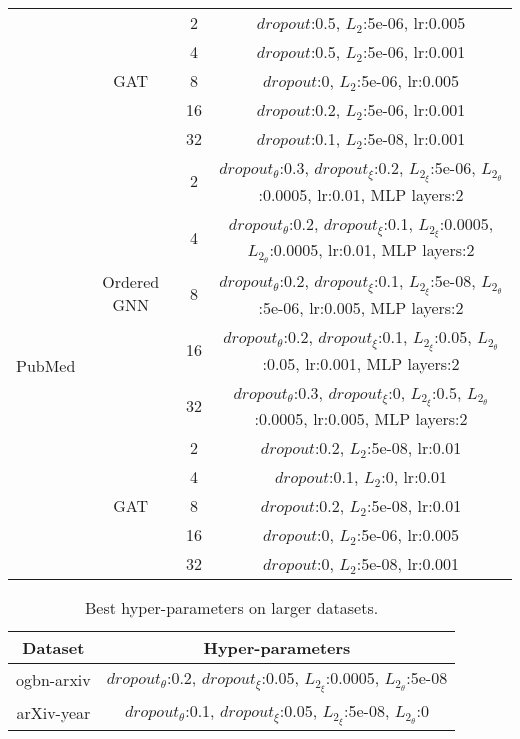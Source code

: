 \documentclass{article}
\begin{document}
\begin{table}
{\begin{tabular}{cc|c|c}
& \multirow{5}{*}{GAT} & 2 & $dropout$:0.5, $L_{2}$:5e-06, lr:0.005\\
\cline{3-4}
&& 4 & $dropout$:0.5, $L_{2}$:5e-06, lr:0.001\\
\cline{3-4}
&& 8 & $dropout$:0, $L_{2}$:5e-06, lr:0.005\\
\cline{3-4}
&& 16 & $dropout$:0.2, $L_{2}$:5e-06, lr:0.001\\
\cline{3-4}
&& 32 & $dropout$:0.1, $L_{2}$:5e-08, lr:0.001\\
\cline{1-4}






\multirow{10}{*}{PubMed} & \multirow{5}{*}{Ordered GNN} & 2 & $dropout_{\theta}$:0.3, $dropout_{\xi}$:0.2, $L_{2_{\xi}}$:5e-06, $L_{2_{\theta}}$:0.0005, lr:0.01, MLP layers:2\\
\cline{3-4}
&& 4 & $dropout_{\theta}$:0.2, $dropout_{\xi}$:0.1, $L_{2_{\xi}}$:0.0005, $L_{2_{\theta}}$:0.0005, lr:0.01, MLP layers:2\\
\cline{3-4}
&& 8 & $dropout_{\theta}$:0.2, $dropout_{\xi}$:0.1, $L_{2_{\xi}}$:5e-08, $L_{2_{\theta}}$:5e-06, lr:0.005, MLP layers:2\\
\cline{3-4}
&& 16 & $dropout_{\theta}$:0.2, $dropout_{\xi}$:0.1, $L_{2_{\xi}}$:0.05, $L_{2_{\theta}}$:0.05, lr:0.001, MLP layers:2\\
\cline{3-4}
&& 32 & $dropout_{\theta}$:0.3, $dropout_{\xi}$:0, $L_{2_{\xi}}$:0.5, $L_{2_{\theta}}$:0.0005, lr:0.005, MLP layers:2\\
\cline{2-4}


& \multirow{5}{*}{GAT} & 2 & $dropout$:0.2, $L_{2}$:5e-08, lr:0.01\\
\cline{3-4}
&& 4 & $dropout$:0.1, $L_{2}$:0, lr:0.01\\
\cline{3-4}
&& 8 & $dropout$:0.2, $L_{2}$:5e-08, lr:0.01\\
\cline{3-4}
&& 16 & $dropout$:0, $L_{2}$:5e-06, lr:0.005\\
\cline{3-4}
&& 32 & $dropout$:0, $L_{2}$:5e-08, lr:0.001\\
\bottomrule

\end{tabular}
}
\end{table}



\begin{table}
\caption{Best hyper-parameters on larger datasets.}
\label{table.hyper.larger}
\centering
\begin{tabular}{c|c}

\toprule
Dataset & Hyper-parameters\\
\midrule
ogbn-arxiv & $dropout_{\theta}$:0.2, $dropout_{\xi}$:0.05, $L_{2_{\xi}}$:0.0005, $L_{2_{\theta}}$:5e-08\\
\midrule
arXiv-year & $dropout_{\theta}$:0.1, $dropout_{\xi}$:0.05, $L_{2_{\xi}}$:5e-08, $L_{2_{\theta}}$:0\\
\bottomrule

\end{tabular}
\end{table}
\end{document}
